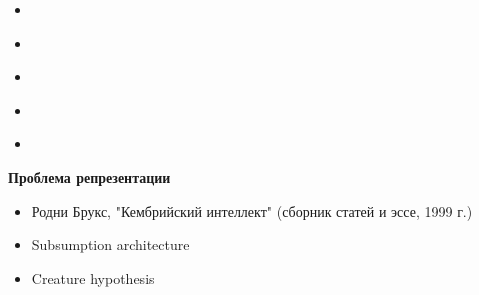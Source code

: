 \documentclass{beamer}
\begin{document}
\begin{frame}{}
\begin{itemize}
	\item 
	\medskip
\end{itemize}
\end{frame}

\begin{frame}{}
\begin{itemize}
	\item 
	\medskip
\end{itemize}
\end{frame}

\begin{frame}{}
\begin{itemize}
	\item 
	\medskip
\end{itemize}
\end{frame}

\begin{frame}{}
\begin{itemize}
	\item 
	\medskip
\end{itemize}
\end{frame}

\begin{frame}{}
\begin{itemize}
	\item 
	\medskip
\end{itemize}
\end{frame}


%
%

\begin{frame}{}
\begin{center}
	\textbf{Проблема репрезентации}
\end{center}
\end{frame}

\begin{frame}{}
\begin{itemize}
	\item Родни Брукс, "Кембрийский интеллект" (сборник статей и эссе, 1999 г.)
	\medskip
	\item Subsumption architecture
	\medskip
	\item Creature hypothesis
\end{itemize}
\end{frame}
\end{document}
